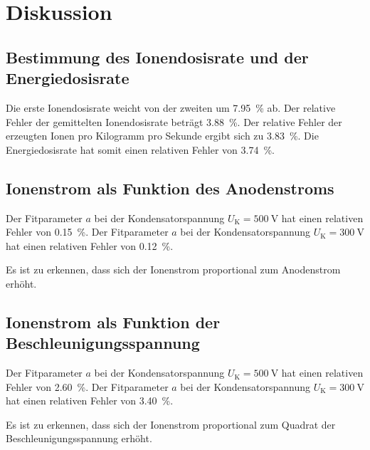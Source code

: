 \section{Diskussion}
\label{sec:Diskussion}

\subsection{Bestimmung des Ionendosisrate und der Energiedosisrate}
Die erste Ionendosisrate weicht von der zweiten um \SI{7.95}{\percent} ab. 
Der relative Fehler der gemittelten Ionendosisrate beträgt \SI{3.88}{\percent}. 
Der relative Fehler der erzeugten Ionen pro Kilogramm pro Sekunde ergibt sich zu \SI{3.83}{\percent}. 
Die Energiedosisrate hat somit einen relativen Fehler von \SI{3.74}{\percent}. 

\subsection{Ionenstrom als Funktion des Anodenstroms}
Der Fitparameter $a$ bei der Kondensatorspannung $U_\text{K} = \SI{500}{\volt}$ hat einen relativen Fehler von \SI{0.15}{\percent}. 
Der Fitparameter $a$ bei der Kondensatorspannung $U_\text{K} = \SI{300}{\volt}$ hat einen relativen Fehler von \SI{0.12}{\percent}. 

\noindent Es ist zu erkennen, dass sich der Ionenstrom proportional zum Anodenstrom erhöht. 

\subsection{Ionenstrom als Funktion der Beschleunigungsspannung}
Der Fitparameter $a$ bei der Kondensatorspannung $U_\text{K} = \SI{500}{\volt}$ hat einen relativen Fehler von \SI{2.60}{\percent}. 
Der Fitparameter $a$ bei der Kondensatorspannung $U_\text{K} = \SI{300}{\volt}$ hat einen relativen Fehler von \SI{3.40}{\percent}. 

\noindent Es ist zu erkennen, dass sich der Ionenstrom proportional zum Quadrat der Beschleunigungsspannung erhöht. 
